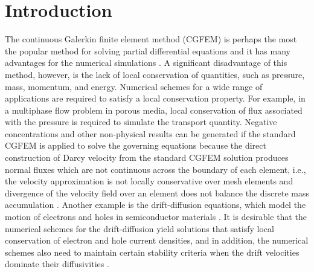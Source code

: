 \documentclass[times]{nlaauth}
\numberwithin{equation}{section}
\begin{document}
\section{Introduction} \label{sec:intro}

\noindent
The continuous Galerkin finite element method (CGFEM) is perhaps the most the popular method for solving partial differential equations and it has many advantages for the numerical simulations \cite{brenner2008mathematical}. A significant disadvantage of this method, however, is the lack of local conservation of quantities, such as pressure, mass, momentum, and energy. Numerical schemes for a wide range of applications are required to satisfy a local conservation property. For example, in a multiphase flow problem in porous media, local conservation of flux associated with the pressure is required to simulate the transport quantity. Negative concentrations and other non-physical results can be generated if the standard CGFEM is applied to solve the governing equations because the direct construction of Darcy velocity from the standard CGFEM solution produces normal fluxes which are not continuous across the boundary of each element, i.e., the velocity approximation is not locally conservative over mesh elements and divergence of the velocity field  over an element does not balance the discrete mass accumulation \cite{povich2013finite}. 
Another example is the drift-diffusion equations, which model the motion of electrons and holes in semiconductor materials \cite{mock1983analysis, markowich1986stationary}. It is desirable that the numerical schemes for the drift-diffusion yield solutions that satisfy local conservation of electron and hole current densities, and in addition, the numerical schemes also need to maintain certain stability criteria when the drift velocities dominate their diffusivities \cite{bochev2013new}. 
\end{document}
